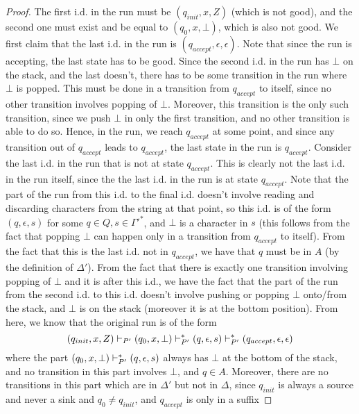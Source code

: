 \begin{soln}
\begin{proof}
        The first i.d. in the run must be $(q_{init}, x, Z)$ (which is not good), and the second one must exist and be equal to $(q_0, x, \bot)$, which is also not good.\nl
        We first claim that the last i.d. in the run is $(q_{accept}, \epsilon, \epsilon)$.
        Note that since the run is accepting, the last state has to be good. Since the second i.d. in the run has $\bot$ on the stack, and the last doesn't, there has to be some transition in the run
        where $\bot$ is popped. This must be done in a transition from $q_{accept}$ to itself, since no other transition involves popping of $\bot$. Moreover, this transition is the only such
        transition, since we push $\bot$ in only the first transition, and no other transition is able to do so.\nl
        Hence, in the run, we reach $q_{accept}$ at some point, and since any transition out of $q_{accept}$ leads to $q_{accept}$, the last state in the run is $q_{accept}$.\nl
        Consider the last i.d. in the run that is not at state $q_{accept}$. This is clearly not the last i.d. in the run itself, since the the last i.d. in the run is at state $q_{accept}$. Note that
        the part of the run from this i.d. to the final i.d. doesn't involve reading and discarding characters from the string at that point, so this i.d. is of the form $(q, \epsilon, s)$ for
        some $q \in Q, s \in \Gamma'^*$, and $\bot$ is a character in $s$ (this follows from the fact that popping $\bot$ can happen only in a transition from $q_{accept}$ to itself). From the fact that this is the last i.d. not in $q_{accept}$, we have that $q$ must be in $A$ (by the definition of
        $\Delta'$). From the fact that there is exactly one transition involving popping of $\bot$ and it is after this i.d., we have the fact that the part of the run from the second i.d. to
        this i.d. doesn't involve pushing or popping $\bot$ onto/from the stack, and $\bot$ is on the stack (moreover it is at the bottom position).\nl
        From here, we know that the original run is of the form $$(q_{init}, x, Z) \vdash_{P'} (q_0, x, \bot) \vdash_{P'}^* (q, \epsilon, s) \vdash_{P'}^* (q_{accept}, \epsilon,
        \epsilon)$$
        where the part $(q_0, x, \bot) \vdash_{P'}^* (q, \epsilon, s)$ always has $\bot$ at the bottom of the stack, and no transition in this part involves $\bot$, and $q \in A$. Moreover, there are no
        transitions in this part which are in $\Delta'$ but not in $\Delta$, since $q_{init}$ is always a source and never a sink and $q_0 \ne q_{init}$, and $q_{accept}$ is only in a suffix

\end{proof}
\end{soln}
